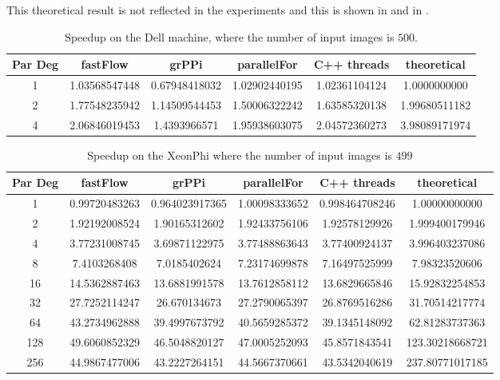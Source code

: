 \documentclass[12pt,a4paper,english]{article}
\begin{document}
     This theoretical result is not reflected in the experiments and this is shown in  and in .

\begin{table}[h]
\begin{tabular}{cccccc}
  {\bf Par Deg} & {\bf fastFlow} & {\bf grPPi} & {\bf parallelFor} & {\bf C++ threads} & {\bf theoretical}\\
  \toprule
  1 & 1.03568547448 & 0.67948418032 & 1.02902440195 & 1.02361104124 & 1.0000000000\\
2 & 1.77548235942 & 1.14509544453 & 1.50006322242 & 1.63585320138 & 1.99680511182\\
4 & 2.06846019453 & 1.4393966571 & 1.95938603075 & 2.04572360273 & 3.98089171974\\
\bottomrule
\end{tabular}
  \caption{Speedup on the Dell machine, where the number of input images is $500$.\label{tab:dell}}
\end{table}

\begin{table}[h]
\begin{tabular}{cccccc}
  {\bf Par Deg} & {\bf fastFlow} & {\bf grPPi} & {\bf parallelFor} & {\bf C++ threads} & {\bf theoretical}\\
  \toprule
  1 & 0.99720483263 & 0.964023917365 & 1.00098333652 & 0.998464708246 & 1.00000000000 \\
2 & 1.92192008524 & 1.90165312602 & 1.92433756106 & 1.92578129926 & 1.999400179946\\
4 & 3.77231008745 & 3.69871122975 & 3.77488863643 & 3.77400924137 & 3.996403237086\\
8 & 7.4103268408 & 7.0185402624 & 7.23174699878 & 7.16497525999 & 7.98323520606\\
16 & 14.5362887463 & 13.6881991578 & 13.7612858112 & 13.6829665846 & 15.92832254853\\
32 & 27.7252114247 & 26.670134673 & 27.2790065397 & 26.8769516286 & 31.70514217774\\
64 & 43.2734962888 & 39.4997673792 & 40.5659285372 & 39.1345148092 & 62.81283737363\\
128 & 49.6060852329 & 46.5048820127 & 47.0005252093 & 45.8571843541 & 123.30218668721\\
256 & 44.9867477006 & 43.2227264151 & 44.5667370661 & 43.5342040619 & 237.80771017185\\
  \bottomrule
\end{tabular}
  \caption{Speedup on the XeonPhi where the number of input images is $499$\label{tab:xeon}}
\end{table}
\end{document}
